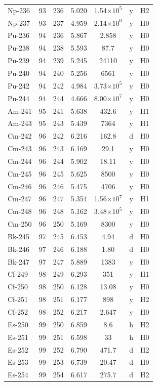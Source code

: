 \documentclass[11pt,a4paper]{article}
\begin{document}
\begin{small}
\begin{longtable}{lcccccc}
Np-236 & 93 & 236 & 5.020 & 1.54$\times 10^{5}$ & y & H2 \\
Np-237 & 93 & 237 & 4.959 & 2.14$\times 10^{6}$ & y & H0 \\
Pu-236 & 94 & 236 & 5.867 & 2.858 & y & H0 \\
Pu-238 & 94 & 238 & 5.593 & 87.7 & y & H0 \\
Pu-239 & 94 & 239 & 5.245 & 24110 & y & H0 \\
Pu-240 & 94 & 240 & 5.256 & 6561 & y & H0 \\
Pu-242 & 94 & 242 & 4.984 & 3.73$\times 10^{5}$ & y & H0 \\
Pu-244 & 94 & 244 & 4.666 & 8.00$\times 10^{7}$ & y & H0 \\
Am-241 & 95 & 241 & 5.638 & 432.6 & y & H1 \\
Am-243 & 95 & 243 & 5.439 & 7364 & y & H1 \\
Cm-242 & 96 & 242 & 6.216 & 162.8 & d & H0 \\
Cm-243 & 96 & 243 & 6.169 & 29.1 & y & H0 \\
Cm-244 & 96 & 244 & 5.902 & 18.11 & y & H0 \\
Cm-245 & 96 & 245 & 5.625 & 8500 & y & H0 \\
Cm-246 & 96 & 246 & 5.475 & 4706 & y & H0 \\
Cm-247 & 96 & 247 & 5.354 & 1.56$\times 10^{7}$ & y & H1 \\
Cm-248 & 96 & 248 & 5.162 & 3.48$\times 10^{5}$ & y & H0 \\
Cm-250 & 96 & 250 & 5.169 & 8300 & y & H0 \\
Bk-245 & 97 & 245 & 6.453 & 4.94 & d & H0 \\
Bk-246 & 97 & 246 & 6.188 & 1.80 & d & H0 \\
Bk-247 & 97 & 247 & 5.889 & 1383 & y & H0 \\
Cf-249 & 98 & 249 & 6.293 & 351 & y & H1 \\
Cf-250 & 98 & 250 & 6.128 & 13.08 & y & H0 \\
Cf-251 & 98 & 251 & 6.177 & 898 & y & H2 \\
Cf-252 & 98 & 252 & 6.217 & 2.647 & y & H0 \\
Es-250 & 99 & 250 & 6.859 & 8.6 & h & H2 \\
Es-251 & 99 & 251 & 6.598 & 33 & h & H0 \\
Es-252 & 99 & 252 & 6.790 & 471.7 & d & H2 \\
Es-253 & 99 & 253 & 6.739 & 20.47 & d & H0 \\
Es-254 & 99 & 254 & 6.617 & 275.7 & d & H2 \\

\end{longtable}
\end{small}
\end{document}
